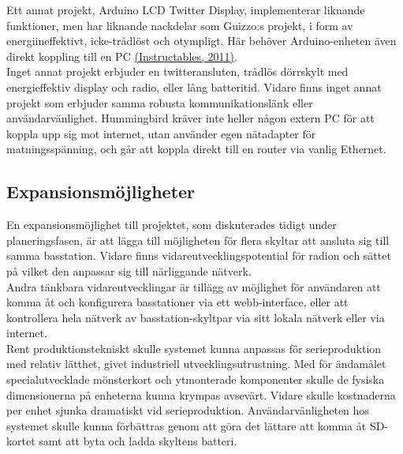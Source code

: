 \documentclass[a4paper,11pt]{article}
\begin{document}
Ett annat projekt, Arduino LCD Twitter Display, implementerar liknande funktioner, men har liknande nackdelar som Guizzo:s projekt, i form av energiineffektivt, icke-trådlöst och otympligt. Här behöver Arduino-enheten även direkt koppling till en PC \hyperref[instructables]{(Instructables, 2011)}. \\

Inget annat projekt erbjuder en twitteransluten, trådlös dörrskylt med energieffektiv display och radio, eller lång batteritid. Vidare finns inget annat projekt som erbjuder samma robusta kommunikationslänk eller användarvänlighet. Hummingbird kräver inte heller någon extern PC för att koppla upp sig mot internet, utan använder egen nätadapter för matningsspänning, och går att koppla direkt till en router via vanlig Ethernet. \\

\subsection{Expansionsmöjligheter}
En expansionsmöjlighet till projektet, som diskuterades tidigt under planeringsfasen, är att lägga till möjligheten för flera skyltar att ansluta sig till samma basstation. Vidare finns vidareutvecklingspotential för radion och sättet på vilket den anpassar sig till närliggande nätverk. \\

Andra tänkbara vidareutvecklingar är tillägg av möjlighet för användaren att komma åt och konfigurera basstationer via ett webb-interface, eller att kontrollera hela nätverk av basstation-skyltpar via sitt lokala nätverk eller via internet. \\

Rent produktionstekniskt skulle systemet kunna anpassas för serieproduktion med relativ lätthet, givet industriell utvecklingsutrustning. Med för ändamålet specialutvecklade mönsterkort och ytmonterade komponenter skulle de fysiska dimensionerna på enheterna kunna krympas avsevärt. Vidare skulle kostnaderna per enhet sjunka dramatiskt vid serieproduktion. Användarvänligheten hos systemet skulle kunna förbättras genom att göra det lättare att komma åt SD-kortet samt att byta och ladda skyltens batteri. 

\pagebreak
\end{document}
